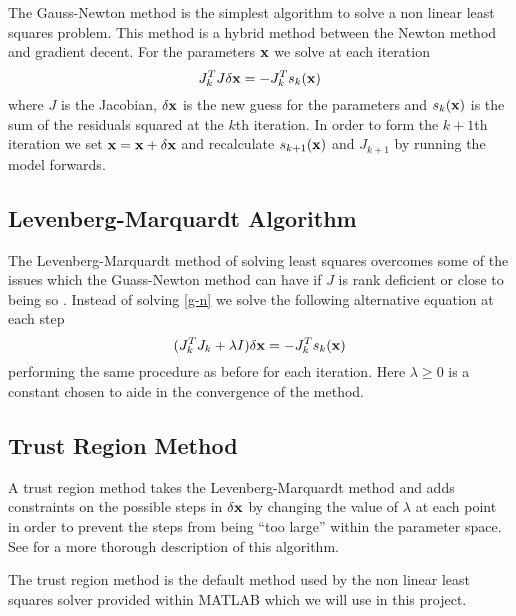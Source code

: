 The Gauss-Newton method is the simplest algorithm to solve a non linear least squares problem. This
method is a hybrid method between the Newton method and gradient decent. For the parameters $\mathbf{x}$ we
solve at each iteration
\begin{equation} \label{g-n}
J_k^{T} J \delta \mathbf{x} = - J_{k}^{T} s_k(\mathbf{x})
\end{equation}
where $J$ is the Jacobian, $\delta \mathbf{x}$ is the new guess for the parameters and $s_k(\mathbf{x})$ is the sum
of the residuals squared at the $k$th iteration. In order to form the $k+1$th iteration we set $\mathbf{x} = \mathbf{x} + \delta \mathbf{x}$
and recalculate $s_{k+1}(\mathbf{x})$ and $J_{k+1}$ by running the model forwards.

\subsection{Levenberg-Marquardt Algorithm}

The Levenberg-Marquardt method of solving least squares overcomes some of the issues which the Guass-Newton
method can have if $J$ is rank deficient or close to being so \citet{Nocedal}. Instead of solving
\eqref{g-n} we solve the following alternative equation at each step
\begin{equation}
(J_{k}^T J_k + \lambda I)\delta \mathbf{x} = - J_{k}^{T} s_k(\mathbf{x})
\end{equation}
performing the same procedure as before for each iteration. Here $\lambda \geq 0$ is a constant chosen to
aide in the convergence of the method.

\subsection{Trust Region Method}

A trust region method takes the Levenberg-Marquardt method and adds constraints on the possible steps
in $\delta \mathbf{x}$ by changing the value of $\lambda$ at each point in order to prevent the steps from being
``too large'' within the parameter space. See \citet{kelley1999iterative} for a more thorough description
of this algorithm.

The trust region method is the default method used by the non linear least squares solver provided
within MATLAB which we will use in this project.